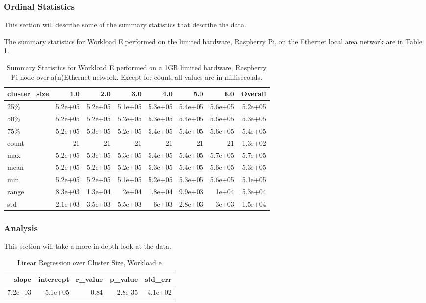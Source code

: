 \subsubsection{Ordinal Statistics}
This section will describe some of the summary statistics that describe the data.  

The summary statistics for Workload E performed on the limited hardware, Raspberry Pi, on the Ethernet local area network are in Table \ref{table:summary_table_e_1GB_rp_eth}.
\begin{table}
\begin{tabular}{lrrrrrrr}
\toprule
cluster\_size &     1.0 &     2.0 &     3.0 &     4.0 &     5.0 &     6.0 &  Overall \\
\midrule
25\%   & 5.2e+05 & 5.2e+05 & 5.1e+05 & 5.3e+05 & 5.4e+05 & 5.6e+05 &  5.2e+05 \\
50\%   & 5.2e+05 & 5.2e+05 & 5.2e+05 & 5.3e+05 & 5.4e+05 & 5.6e+05 &  5.3e+05 \\
75\%   & 5.2e+05 & 5.3e+05 & 5.2e+05 & 5.4e+05 & 5.4e+05 & 5.6e+05 &  5.4e+05 \\
count &      21 &      21 &      21 &      21 &      21 &      21 &  1.3e+02 \\
max   & 5.2e+05 & 5.3e+05 & 5.3e+05 & 5.4e+05 & 5.4e+05 & 5.7e+05 &  5.7e+05 \\
mean  & 5.2e+05 & 5.2e+05 & 5.2e+05 & 5.3e+05 & 5.4e+05 & 5.6e+05 &  5.3e+05 \\
min   & 5.2e+05 & 5.2e+05 & 5.1e+05 & 5.2e+05 & 5.3e+05 & 5.6e+05 &  5.1e+05 \\
range & 8.3e+03 & 1.3e+04 &   2e+04 & 1.8e+04 & 9.9e+03 &   1e+04 &  5.3e+04 \\
std   & 2.1e+03 & 3.5e+03 & 5.5e+03 &   6e+03 & 2.8e+03 &   3e+03 &  1.5e+04 \\
\bottomrule
\end{tabular}
\caption{Summary Statistics for Workload E performed on a 1GB limited hardware, Raspberry Pi node over a(n)Ethernet network.  Except for count, all values are in milliseconds.}
\label{table:summary_table_e_1GB_rp_eth}
\end{table}



\subsubsection{Analysis}
This section will take a more in-depth look at the data.


\begin{table}[H]
\centering
\begin{tabular}{rrrrr}
\toprule
  slope &  intercept &  r\_value &  p\_value &  std\_err \\
\midrule
7.2e+03 &    5.1e+05 &     0.84 &  2.8e-35 &  4.1e+02 \\
\bottomrule
\end{tabular}
\caption{Linear Regression over Cluster Size, Workload e}
\label{table:rp_only_e}
\end{table}



